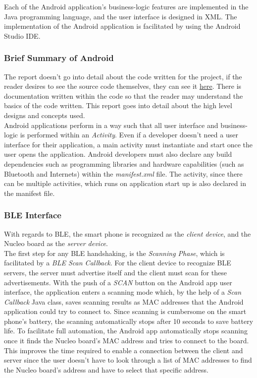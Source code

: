 Each of the Android application's business-logic features are implemented in the Java programming language, and the user interface is designed in XML. The implementation of the Android application is facilitated by using the Android Studio IDE.\\

\subsubsection{Brief Summary of Android}

The report doesn't go into detail about the code written for the project, if the reader desires to see the source code themselves, they can see it \href{https://github.com/lebrice/MicroP/tree/master/project}{here}. There is documentation written within the code so that the reader may understand the basics of the code written. This report goes into detail about the high level designs and concepts used.\\

Android applications perform in a way such that all user interface and business-logic is performed within an \textit{Activity}. Even if a developer doesn't need a user interface for their application, a main activity must instantiate and start once the user opens the application. Android developers must also declare any build dependencies such as programming libraries and hardware capabilities (such as Bluetooth and Internets) within the \textit{manifest.xml} file. The activity, since there can be multiple activities, which runs on application start up is also declared in the manifest file.\\

\subsubsection{BLE Interface}

With regards to BLE, the smart phone is recognized as the \textit{client device}, and the Nucleo board as the \textit{server device}.\\ 

The first step for any BLE handshaking, is the \textit{Scanning Phase}, which is facilitated by a \textit{BLE Scan Callback}. For the client device to recognize BLE servers, the server must advertise itself and the client must scan for these advertisements. With the push of a \textit{SCAN} button on the Android app user interface, the application enters a scanning mode which, by the help of a \textit{Scan Callback} Java class, saves scanning results as MAC addresses that the Android application could try to connect to. Since scanning is cumbersome on the smart phone's battery, the scanning automatically stops after 10 seconds to save battery life. To facilitate full automation, the Android app automatically stops scanning once it finds the Nucleo board's MAC address and tries to connect to the board. This improves the time required to enable a connection between the client and server since the user doesn't have to look through a list of MAC addresses to find the Nucleo board's address and have to select that specific address.\\

